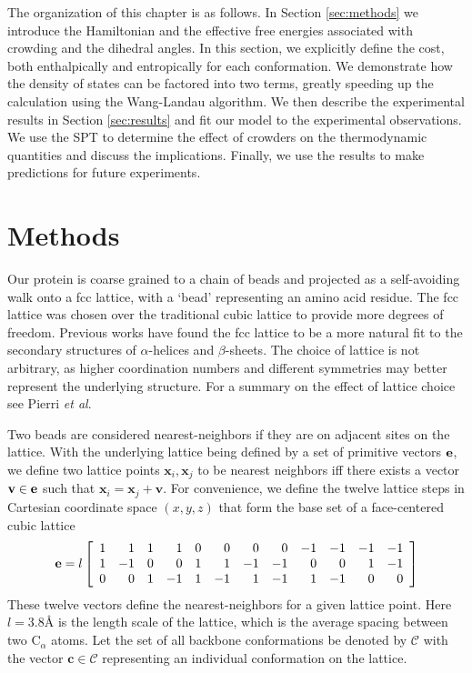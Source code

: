 The organization of this chapter is as follows. In Section \ref{sec:methods} we introduce the Hamiltonian and the effective free energies associated with crowding and the dihedral angles. In this section, we explicitly define the cost, both enthalpically and entropically for each conformation. We demonstrate how the density of states can be factored into two terms, greatly speeding up the calculation using the Wang-Landau algorithm. We then describe the experimental results in Section \ref{sec:results} and fit our model to the experimental observations. We use the SPT to determine the effect of crowders on the thermodynamic quantities and discuss the implications. Finally, we use the results to make predictions for future experiments.

\section{Methods \label{sec:methods}}

Our protein is coarse grained to a chain of beads and projected as a self-avoiding walk onto a fcc lattice, with a `bead' representing an amino acid residue. The fcc lattice was chosen over the traditional cubic lattice to provide more degrees of freedom. Previous works have found the fcc lattice to be a more natural fit to the secondary structures of $\alpha$-helices and $\beta$-sheets.\cite{peto_generation_2007, pokarowski_minimal_2003} The choice of lattice is not arbitrary, as higher coordination numbers and different symmetries may better represent the underlying structure. For a summary on the effect of lattice choice see Pierri \textit{et al}.\cite{pierri_lattices_2008}

Two beads are considered nearest-neighbors if they are on adjacent sites on the lattice. With the underlying lattice being defined by a set of primitive vectors ${\bf e}$, we define two lattice points $\mathbf{x}_i, \mathbf{x}_j$ to be nearest neighbors iff there exists a vector $\mathbf{v} \in {\bf e}$ such that $\mathbf{x}_i =  \mathbf{x}_j + \mathbf{v}$. For convenience, we define the twelve lattice steps in Cartesian coordinate space $(x,y,z)$ that form the base set of a face-centered cubic lattice
\begin{equation*}
{\bf e} = l
\left[ 
\begin{array}{rrrrrrrrrrrr}
1&1&1&1&0&0&0&0&-1&-1&-1&-1\\
1&-1&0&0&1&1&-1&-1&0&0&1&-1\\
0&0&1&-1&1&-1&1&-1&1&-1&0&0
\end{array}
 \right]
\end{equation*}
%
These twelve vectors define the nearest-neighbors for a given lattice point. Here $l=3.8$\AA  \hspace{.2em} is the length scale of the lattice, which is the average spacing between two C$_\alpha$ atoms. Let the set of all backbone conformations be denoted by $\mathcal{C}$ with the vector $\mathbf{c} \in \mathcal{C}$ representing an individual conformation on the lattice. 

